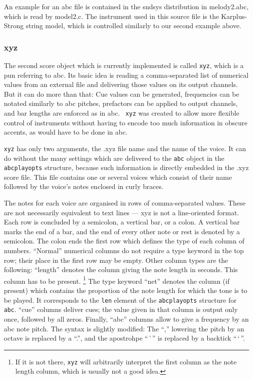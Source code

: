 \documentclass{article}
\def\s{{\sc sndsys} }
\begin{document}
An example for an abc file is contained in the \s distribution in melody2.abc,
which is read by model2.c.  The instrument used in this source file is the
Karplus-Strong string model, which is controlled similarly to our second
example above.


\subsubsection{xyz}

The second score object which is currently implemented is called {\tt xyz},
which is a pun referring to abc.  Its basic idea is reading a comma-separated
list of numerical values from an external file and delivering those values on
its output channels.  But it can do more than that:  Cue values can be
generated, frequencies can be notated similarly to abc pitches, prefactors can
be applied to output channels, and bar lengths are enforced as in abc.  {\tt
xyz} was created to allow more flexible control of instruments without having
to encode too much information in obscure accents, as would have to be done in
abc.

{\tt xyz} has only two arguments, the .xyz file name and the name of the voice.
It can do without the many settings which are delivered to the {\tt abc} object
in the {\tt abcplayopts} structure, because such information is directly
embedded in the .xyz score file.  This file contains one or several voices
which consist of their name followed by the voice's notes enclosed in curly
braces.

The notes for each voice are organised in rows of comma-separated values.
These are not necessarily equivalent to text lines --- xyz is not a
line-oriented format.  Each row is concluded by a semicolon, a vertical bar, or
a colon.  A vertical bar marks the end of a bar, and the end of every other
note or rest is denoted by a semicolon.  The colon ends the first row which
defines the type of each column of numbers.  ``Normal'' numerical columns do
not require a type keyword in the top row; their place in the first row may be
empty.  Other column types are the following:  ``length'' denotes the column
giving the note length in seconds.  This column has to be present.%
%
\footnote{If it is not there, {\tt xyz} will arbitrarily interpret the first
column as the note length column, which is usually not a good idea.}
%
The type keyword ``net'' denotes the column (if present) which contains the
proportion of the note length for which the tone is to be played.  It
corresponds to the {\tt len} element of the {\tt abcplayopts} structure for
{\tt abc}.  ``cue'' columns deliver cues; the value given in that column is
output only once, followed by all zeros.  Finally, ``abc'' columns allow to give
a frequency by an abc note pitch.  The syntax is slightly modified: The ``,''
lowering the pitch by an octave is replaced by a ``.'', and the apostrohpe
``{\,'\,}'' is replaced by a backtick ``{\,`\,}''.
\end{document}
